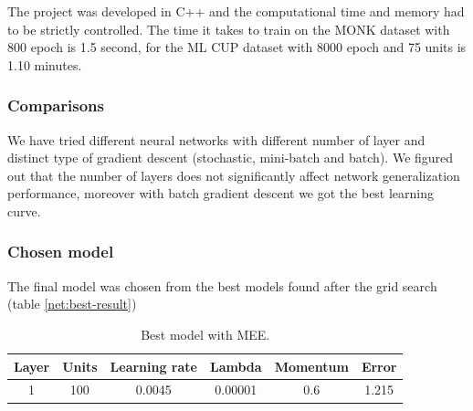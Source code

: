 The project was developed in C++ and the computational time and memory had to be strictly controlled.
The time it takes to train on the MONK dataset with 800 epoch is 1.5 second, for the ML CUP dataset with 8000 epoch and 75 units is 1.10 minutes.
\subsubsection{Comparisons}
We have tried different neural networks with different number of layer and distinct type of gradient descent (stochastic, mini-batch and batch). We figured out that the number of layers does not significantly affect network generalization performance, moreover with batch gradient descent we got the best learning curve.
\subsubsection{Chosen model}
The final model was chosen from the best models found after the grid search (table \ref{net:best-result})
\begin{table}[h!]
	\centering
	\begin{tabular}{|c|c|c|c|c|c|}
		\hline
		\textbf{Layer}& \textbf{Units}& \textbf{Learning rate} & \multicolumn{1}{l|}{\textbf{Lambda}} & \textbf{Momentum} & \textbf{Error}\\ \hline
			1 & 100 & 0.0045 & 0.00001 & 0.6  & 1.215 \\
		  \hline
	\end{tabular}
		\caption{Best model with MEE.}
\end{table}


